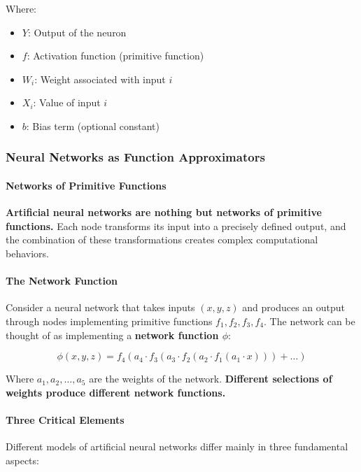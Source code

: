 Where:

\begin{itemize}
\item $Y$: Output of the neuron
\item $f$: Activation function (primitive function)
\item $W_i$: Weight associated with input $i$
\item $X_i$: Value of input $i$
\item $b$: Bias term (optional constant)
\end{itemize}

\subsubsection{Neural Networks as Function Approximators}

\paragraph{Networks of Primitive Functions}

\textbf{Artificial neural networks are nothing but networks of primitive functions.} Each node transforms its input into a precisely defined output, and the combination of these transformations creates complex computational behaviors.

\paragraph{The Network Function}

Consider a neural network that takes inputs $(x, y, z)$ and produces an output through nodes implementing primitive functions $f_1, f_2, f_3, f_4$. The network can be thought of as implementing a \textbf{network function $\phi$}:

\begin{equation}
\phi(x, y, z) = f_4\left(a_4 \cdot f_3\left(a_3 \cdot f_2\left(a_2 \cdot f_1(a_1 \cdot x)\right)\right) + \ldots\right)
\end{equation}

Where $a_1, a_2, \ldots, a_5$ are the weights of the network. \textbf{Different selections of weights produce different network functions.}

\paragraph{Three Critical Elements}

Different models of artificial neural networks differ mainly in three fundamental aspects:

